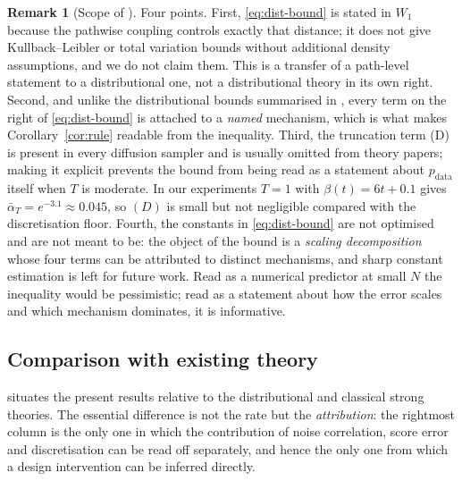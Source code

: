 \documentclass[a4paper,fleqn]{cas-dc}
\theoremstyle{definition}
\newtheorem{remark}[theorem]{Remark}
\begin{document}
\begin{remark}[Scope of ]
\label{rem:dist}
Four points. First, \eqref{eq:dist-bound} is stated in $W_{1}$ because the
pathwise coupling controls exactly that distance; it does not give Kullback--Leibler or
total variation bounds without additional density assumptions, and we do not
claim them. This is a transfer of a path-level statement to a distributional one,
not a distributional theory in its own right. Second, and unlike the distributional bounds summarised in
, every term on the right of \eqref{eq:dist-bound} is attached
to a \emph{named} mechanism, which is what makes Corollary~\ref{cor:rule} readable from
the inequality. Third, the truncation term (D) is present in every diffusion
sampler and is usually omitted from theory papers; making it explicit prevents
the bound from being read as a statement about $p_{\mathrm{data}}$ itself when
$T$ is moderate. In our experiments $T=1$ with $\beta(t)=6t+0.1$ gives
$\bar\alpha_{T}=e^{-3.1}\approx0.045$, so $(D)$ is small but not negligible
compared with the discretisation floor. Fourth, the constants in
\eqref{eq:dist-bound} are not optimised and are not meant to be: the object of the
bound is a \emph{scaling decomposition} whose four terms can be attributed to distinct
mechanisms, and sharp constant estimation is left for future work. Read as a numerical
predictor at small $N$ the inequality would be pessimistic; read as a statement about
how the error scales and which mechanism dominates, it is informative.
\end{remark}

\subsection{Comparison with existing theory}

 situates the present results relative to the distributional and
classical strong theories. The essential difference is not the rate but the
\emph{attribution}: the rightmost column is the only one in which the contribution of
noise correlation, score error and discretisation can be read off separately, and
hence the only one from which a design intervention can be inferred directly.
\end{document}
